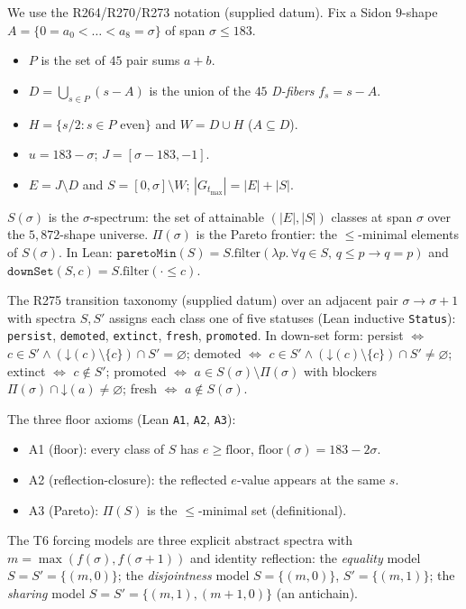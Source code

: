 \documentclass[11pt,a4paper]{article}
\theoremstyle{definition}
\begin{document}
We use the R264/R270/R273 notation (supplied datum). Fix a Sidon
$9$-shape $A=\{0=a_0<\dots<a_8=\sigma\}$ of span $\sigma\le183$.
\begin{itemize}
\item $P$ is the set of $45$ pair sums $a+b$.
\item $D=\bigcup_{s\in P}(s-A)$ is the union of the $45$ \emph{D-fibers}
  $f_s=s-A$.
\item $H=\{s/2:s\in P\text{ even}\}$ and $W=D\cup H$ ($A\subseteq D$).
\item $u=183-\sigma$; $J=[\sigma-183,-1]$.
\item $E=J\setminus D$ and $S=[0,\sigma]\setminus W$; $|G_{t_{\max}}|=
  |E|+|S|$.
\end{itemize}
$S(\sigma)$ is the $\sigma$-spectrum: the set of attainable
$(|E|,|S|)$ classes at span $\sigma$ over the $5{,}872$-shape universe.
$\Pi(\sigma)$ is the Pareto frontier: the $\le$-minimal elements of
$S(\sigma)$. In Lean:
$\mathtt{paretoMin}(S)=S.\mathrm{filter}(\lambda p.\,\forall q\in S,\,
q\le p\to q=p)$ and
$\mathtt{downSet}(S,c)=S.\mathrm{filter}(\cdot\le c)$.

The R275 transition taxonomy (supplied datum) over an adjacent pair
$\sigma\to\sigma+1$ with spectra $S,S'$ assigns each class one of five
statuses (Lean inductive \texttt{Status}):
\texttt{persist}, \texttt{demoted}, \texttt{extinct},
\texttt{fresh}, \texttt{promoted}. In down-set form: persist $\iff$
$c\in S'\land(\mathord\downarrow(c)\setminus\{c\})\cap S'=\varnothing$;
demoted $\iff$ $c\in S'\land(\mathord\downarrow(c)\setminus\{c\})\cap
S'\neq\varnothing$; extinct $\iff$ $c\notin S'$; promoted $\iff$
$a\in S(\sigma)\setminus\Pi(\sigma)$ with blockers
$\Pi(\sigma)\cap\mathord\downarrow(a)\neq\varnothing$; fresh $\iff$
$a\notin S(\sigma)$.

The three floor axioms (Lean \texttt{A1}, \texttt{A2}, \texttt{A3}):
\begin{itemize}
\item A1 (floor): every class of $S$ has $e\ge\mathrm{floor}$,
  $\mathrm{floor}(\sigma)=183-2\sigma$.
\item A2 (reflection-closure): the reflected $e$-value appears at the
  same $s$.
\item A3 (Pareto): $\Pi(S)$ is the $\le$-minimal set (definitional).
\end{itemize}
The T6 forcing models are three explicit abstract spectra with
$m=\max(f(\sigma),f(\sigma+1))$ and identity reflection: the
\emph{equality} model $S=S'=\{(m,0)\}$; the \emph{disjointness} model
$S=\{(m,0)\}$, $S'=\{(m,1)\}$; the \emph{sharing} model
$S=S'=\{(m,1),(m+1,0)\}$ (an antichain).
\end{document}
